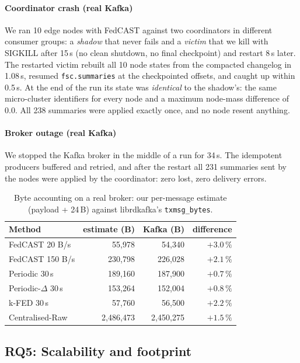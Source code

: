 \paragraph{Coordinator crash (real Kafka)} We ran 10 edge nodes with FedCAST against two coordinators in different consumer groups: a \emph{shadow} that never fails and a \emph{victim} that we kill with SIGKILL after 15\,s (no clean shutdown, no final checkpoint) and restart 8\,s later. The restarted victim rebuilt all 10 node states from the compacted changelog in 1.08\,s, resumed \texttt{fsc.summaries} at the checkpointed offsets, and caught up within 0.5\,s. At the end of the run its state was \emph{identical} to the shadow's: the same micro-cluster identifiers for every node and a maximum node-mass difference of 0.0. All 238 summaries were applied exactly once, and no node resent anything.

\paragraph{Broker outage (real Kafka)} We stopped the Kafka broker in the middle of a run for 34\,s. The idempotent producers buffered and retried, and after the restart all 231 summaries sent by the nodes were applied by the coordinator: zero lost, zero delivery errors.

\begin{table}[t]
\centering\small
\caption{Byte accounting on a real broker: our per-message estimate (payload + 24\,B) against librdkafka's \texttt{txmsg\_bytes}.}\label{tab:k1}
\setlength{\tabcolsep}{3pt}
\begin{tabular}{@{}lrrr@{}}
\toprule
Method & estimate (B) & Kafka (B) & difference\\
\midrule
FedCAST 20 B/s & 55{,}978 & 54{,}340 & $+3.0\,\%$\\
FedCAST 150 B/s & 230{,}798 & 226{,}028 & $+2.1\,\%$\\
Periodic 30\,s & 189{,}160 & 187{,}900 & $+0.7\,\%$\\
Periodic-$\Delta$ 30\,s & 153{,}264 & 152{,}004 & $+0.8\,\%$\\
k-FED 30\,s & 57{,}760 & 56{,}500 & $+2.2\,\%$\\
Centralised-Raw & 2{,}486{,}473 & 2{,}450{,}275 & $+1.5\,\%$\\
\bottomrule
\end{tabular}
\end{table}

\subsection{RQ5: Scalability and footprint}\label{sec:rq5}

